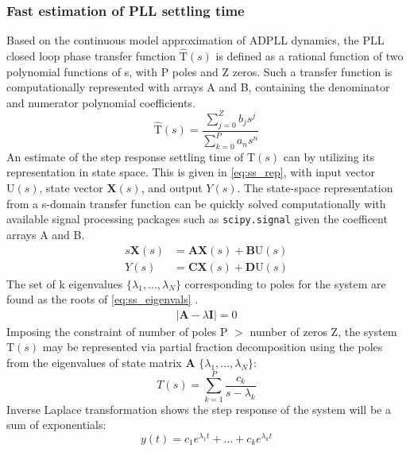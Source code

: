 \subsubsection{Fast estimation of PLL settling time}
	Based on the continuous model approximation of ADPLL dynamics, the PLL closed loop phase transfer function $\mathrm{\hat{T}}(s)$ is defined as a rational function of two polynomial functions of s, with P poles and Z zeros. Such a transfer function is computationally represented with arrays A and B, containing the denominator and numerator polynomial coefficients.
	\begin{equation}\label{eq:pll_cl_tf}
	\mathrm{\hat{T}}(s) = \frac{\sum_{j=0}^Z b_js^j}{\sum_{k=0}^P a_ns^n}
	\end{equation}
	An estimate of the step response settling time of $\mathrm{T}(s)$ can by utilizing its representation in state space. This is given in \ref{eq:ss_rep}, with input vector $\mathrm{U}(s)$, state vector $\mathbf{X}(s)$, and output $Y(s)$. The state-space representation from a s-domain transfer function can be quickly solved computationally with available signal processing packages such as \texttt{scipy.signal} given the coefficent arrays A and B.
	\begin{align} \label{eq:ss_rep}
		s\mathbf{X}(s) &= \mathbf{AX}(s) +\mathbf{B}\mathrm{U}(s)\\
		Y(s) &= \mathbf{CX}(s) +\mathbf{D}\mathrm{U}(s)
	\end{align}
	The set of k eigenvalues $\{\lambda_1, ... , \lambda_{N}\}$ corresponding to poles for the system are found as the roots of \ref{eq:ss_eigenvals} \cite{brockett_1965}.%
	\begin{align}
		|\mathbf{A} - \lambda \mathbf{I}| = 0\label{eq:ss_eigenvals}%
	\end{align}
	Imposing the constraint of number of poles P $>$ number of zeros Z, the system $\mathrm{T}(s)$ may be represented via partial fraction decomposition using the poles from the eigenvalues of state matrix $\mathbf{A}$ $\{\lambda_1, ... , \lambda_{N}\}$:
	\begin{equation}
		T(s) = \sum_{k=1}^{P} \frac{c_k}{s-\lambda_k}
	\end{equation}
	Inverse Laplace transformation shows the step response of the system will be a sum of exponentials:
	\begin{equation}
		y(t) = c_1e^{\lambda_1t} + ... + c_ke^{\lambda_kt}%
	\end{equation}


